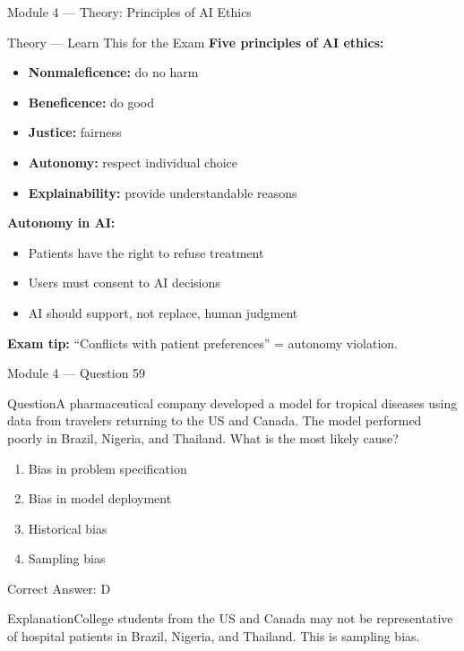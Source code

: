\documentclass[aspectratio=169,10pt]{beamer}
\newcommand{\question}[1]{\begin{block}{Question}#1\end{block}}
\newcommand{\options}[4]{%
	\begin{enumerate}[label=\Alph*.,leftmargin=*]
		\item #1
		\item #2
		\item #3
		\item #4
	\end{enumerate}
}
\newcommand{\answerbox}[1]{\begin{exampleblock}{Correct Answer: #1}\end{exampleblock}}
\newcommand{\explain}[1]{\begin{block}{Explanation}#1\end{block}}
\newcommand{\theory}[1]{%
	\begin{block}{Theory --- Learn This for the Exam}
		\small #1
	\end{block}
}
\begin{document}
	\begin{frame}{Module 4 --- Theory: Principles of AI Ethics}
		\theory{
			\textbf{Five principles of AI ethics:}
			\begin{itemize}
				\item \textbf{Nonmaleficence:} do no harm
				\item \textbf{Beneficence:} do good
				\item \textbf{Justice:} fairness
				\item \textbf{Autonomy:} respect individual choice
				\item \textbf{Explainability:} provide understandable reasons
			\end{itemize}
			\textbf{Autonomy in AI:}
			\begin{itemize}
				\item Patients have the right to refuse treatment
				\item Users must consent to AI decisions
				\item AI should support, not replace, human judgment
			\end{itemize}
			\textbf{Exam tip:} ``Conflicts with patient preferences'' = autonomy violation.
		}
	\end{frame}
	
	\begin{frame}{Module 4 --- Question 59}
		\question{A pharmaceutical company developed a model for tropical diseases using data from travelers returning to the US and Canada. The model performed poorly in Brazil, Nigeria, and Thailand. What is the most likely cause?}
		\options{Bias in problem specification}{Bias in model deployment}{Historical bias}{Sampling bias}
		\answerbox{D}
		\explain{College students from the US and Canada may not be representative of hospital patients in Brazil, Nigeria, and Thailand. This is sampling bias.}
	\end{frame}
	
\end{document}
